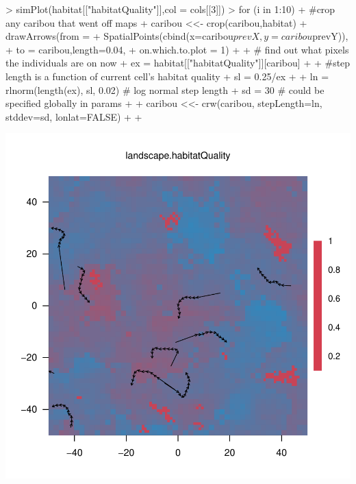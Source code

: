 \documentclass{article}
\begin{document}
\begin{Schunk}
\begin{Sinput}
> simPlot(habitat[["habitatQuality"]],col = cols[[3]])
> for (i in 1:10) {
+   #crop any caribou that went off maps
+   caribou <<- crop(caribou,habitat)
+   drawArrows(from =
+               SpatialPoints(cbind(x=caribou$prevX,y=caribou$prevY)),
+               to = caribou,length=0.04,
+               on.which.to.plot = 1)
+ 
+   # find out what pixels the individuals are on now
+   ex =  habitat[["habitatQuality"]][caribou]
+ 
+   #step length is a function of current cell's habitat quality
+   sl = 0.25/ex
+ 
+   ln = rlnorm(length(ex), sl, 0.02) # log normal step length
+   sd = 30 # could be specified globally in params
+ 
+   caribou <<- crw(caribou, stepLength=ln, stddev=sd, lonlat=FALSE)
+ 
+ }
\end{Sinput}
\end{Schunk}
\includegraphics{introduction-agent-crw-trajectory}
\end{document}
